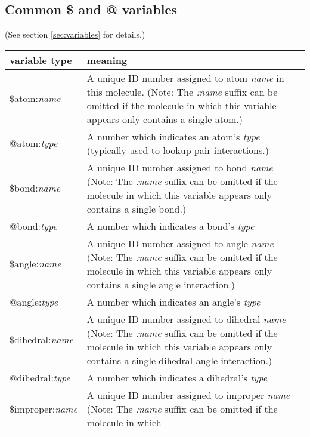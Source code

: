 \documentclass[11pt]{article}
\begin{document}



\pagebreak

\subsection{Common \$ and @ variables}

(See section \ref{sec:variables} for details.) \\
\begin{longtable}[h]{l|p{11cm}}
\textbf{variable type} & \textbf{meaning}
\\
\hline
\hline
\$atom:\textit{name}  &
A unique ID number assigned to atom \textit{name} in this molecule. 
(Note: The \textit{:name} suffix can be omitted if the molecule
in which this variable appears only contains a single atom.)
\\
\hline
@atom:\textit{type}   & 
A number which indicates an atom's \textit{type}
               (typically used to lookup pair interactions.)
\\
\hline
\$bond:\textit{name}  & 
A unique ID number assigned to bond \textit{name}
(Note: The \textit{:name} suffix can be omitted if the molecule
in which this variable appears only contains a single bond.)
\\
\hline
@bond:\textit{type}   & 
A number which indicates a bond's \textit{type}
\\
\hline
\$angle:\textit{name}  & 
A unique ID number assigned to angle \textit{name}
(Note: The \textit{:name} suffix can be omitted if the molecule
in which this variable appears only contains a single angle interaction.)
\\
\hline
@angle:\textit{type}   & 
A number which indicates an angle's \textit{type}
\\
\hline
\$dihedral:\textit{name} & 
A unique ID number assigned to dihedral \textit{name}
(Note: The \textit{:name} suffix can be omitted if the molecule in which 
this variable appears only contains a single dihedral-angle interaction.)
\\
\hline
@dihedral:\textit{type}  & 
A number which indicates a dihedral's \textit{type}
\\
\hline
\$improper:\textit{name}  & 
A unique ID number assigned to improper \textit{name}
(Note: The \textit{:name} suffix can be omitted if the molecule in which 

\end{longtable}
\end{document}
